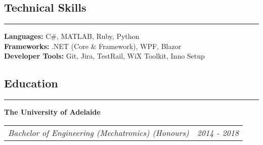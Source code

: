 \documentclass[10pt,letterpaper]{article}
\makeatletter
\newcommand{\headerrow}[2]
{\begin{tabular*}{\linewidth}{l@{\extracolsep{\fill}}r}
	#1 &
	#2 \\
\end{tabular*}}
\makeatother
\begin{document}
\subsection*{Technical Skills}
\vspace{-0.25em}
\hrule
\vspace{1em}
\textbf{Languages:} C\#, MATLAB, Ruby, Python\\
\textbf{Frameworks:} .NET (Core \& Framework), WPF, Blazor \\
\textbf{Developer Tools:} Git, Jira, TestRail, WiX Toolkit, Inno Setup 

\subsection*{Education}
\hrule
\vspace{1em}
{\textbf{The University of Adelaide}} \\
\headerrow
    {\emph{Bachelor of Engineering (Mechatronics) (Honours)}}
    {\emph{2014 - 2018}}
\end{document}
